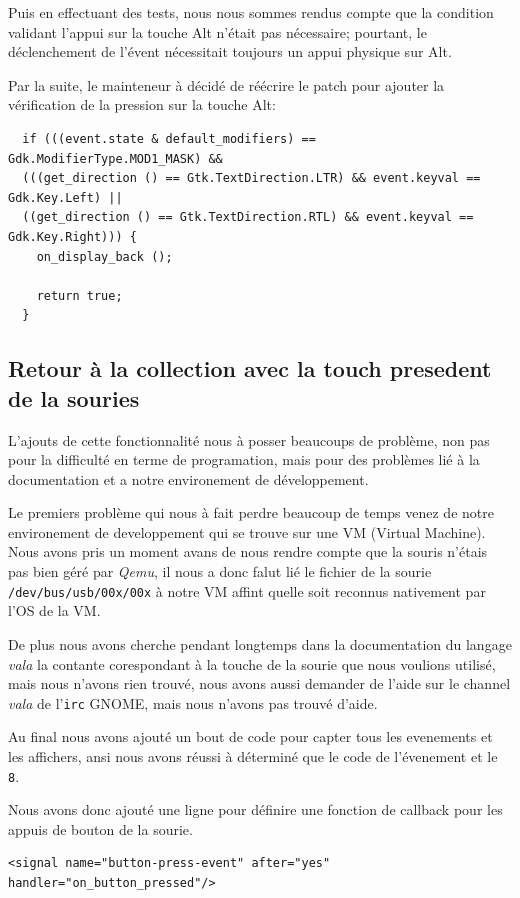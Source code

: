 \documentclass[12pt]{report}
\begin{document}
Puis en effectuant des tests, nous nous sommes rendus compte que la
condition validant l'appui sur la touche Alt n'était pas nécessaire;
pourtant, le déclenchement de l'évent nécessitait toujours un appui
physique sur Alt.

Par la suite, le mainteneur à décidé de réécrire le patch pour ajouter
la vérification de la pression sur la touche Alt:

\begin{verbatim}
  if (((event.state & default_modifiers) == Gdk.ModifierType.MOD1_MASK) &&
  (((get_direction () == Gtk.TextDirection.LTR) && event.keyval == Gdk.Key.Left) ||
  ((get_direction () == Gtk.TextDirection.RTL) && event.keyval == Gdk.Key.Right))) {
    on_display_back ();

    return true;
  }
\end{verbatim}

\subsection{Retour à la collection avec la touch presedent de la souries}
L'ajouts de cette fonctionnalité nous à posser beaucoups de problème, non pas
pour la difficulté en terme de programation, mais pour des problèmes lié à la
documentation et a notre environement de développement.

Le premiers problème qui nous à fait perdre beaucoup de temps venez de notre
environement de developpement qui se trouve sur une VM (Virtual Machine).
Nous avons pris un moment avans de nous rendre compte que la souris n'étais
pas bien géré par \textit{Qemu}, il nous a donc falut lié le fichier de
la sourie \texttt{/dev/bus/usb/00x/00x} à notre VM affint quelle soit reconnus
nativement par l'OS de la VM.

De plus nous avons cherche pendant longtemps dans la documentation du langage
\textit{vala} la contante corespondant à la touche de la sourie que nous
voulions utilisé, mais nous n'avons rien trouvé, nous avons aussi demander
de l'aide sur le channel \textit{vala} de l'\texttt{irc} GNOME, mais nous
n'avons pas trouvé d'aide.

Au final nous avons ajouté un bout de code pour capter tous les evenements et
les affichers, ansi nous avons réussi à déterminé que le code de l'évenement
et le \texttt{8}.

Nous avons donc ajouté une ligne pour définire une fonction de callback pour
les appuis de bouton de la sourie.
\begin{verbatim}
<signal name="button-press-event" after="yes" handler="on_button_pressed"/>
\end{verbatim}
\end{document}
